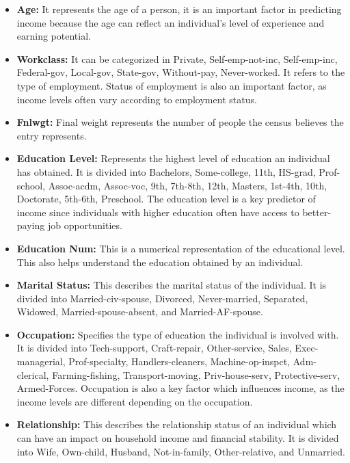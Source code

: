\documentclass[10pt,journal,compsoc]{IEEEtran}
\begin{document}
\begin{itemize}
    \item \textbf{Age:} It represents the age of a person, it is an important factor in predicting income because the age can reflect an individual's level of experience and earning potential.

    \item \textbf{Workclass:} It can be categorized in Private, Self-emp-not-inc, Self-emp-inc, Federal-gov, Local-gov, State-gov, Without-pay, Never-worked. It refers to the type of employment. Status of employment is also an important factor, as income levels often vary according to employment status.

    \item \textbf{Fnlwgt:} Final weight represents the number of people the census believes the entry represents.

    \item \textbf{Education Level:} Represents the highest level of education an individual has obtained. It is divided into Bachelors, Some-college, 11th, HS-grad, Prof-school, Assoc-acdm, Assoc-voc, 9th, 7th-8th, 12th, Masters, 1st-4th, 10th, Doctorate, 5th-6th, Preschool. The education level is a key predictor of income since individuals with higher education often have access to better-paying job opportunities.

    \item \textbf{Education Num:} This is a numerical representation of the educational level. This also helps understand the education obtained by an individual.

    \item \textbf{Marital Status:} This describes the marital status of the individual. It is divided into Married-civ-spouse, Divorced, Never-married, Separated, Widowed, Married-spouse-absent, and Married-AF-spouse.

    \item \textbf{Occupation:} Specifies the type of education the individual is involved with. It is divided into Tech-support, Craft-repair, Other-service, Sales, Exec-managerial, Prof-specialty, Handlers-cleaners, Machine-op-inspct, Adm-clerical, Farming-fishing, Transport-moving, Priv-house-serv, Protective-serv, Armed-Forces. Occupation is also a key factor which influences income, as the income levels are different depending on the occupation.
    
    \item \textbf{Relationship:} This describes the relationship status of an individual which can have an impact on household income and financial stability. It is divided into Wife, Own-child, Husband, Not-in-family, Other-relative, and Unmarried.
 

\end{itemize}
\end{document}
